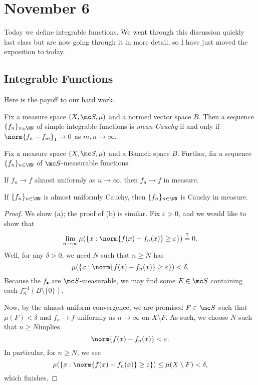 \documentclass[../notes.tex]{subfiles}
\begin{document}
\section{November 6}

Today we define integrable functions. We went through this discussion quickly last class but are now going through it in more detail, so I have just moved the exposition to today.

\subsection{Integrable Functions}
Here is the payoff to our hard work.
\begin{definition}
	Fix a measure space $(X,\mc S,\mu)$ and a normed vector space $B$. Then a sequence $\{f_n\}_{n\in\NN}$ of simple integrable functions is \textit{mean Cauchy} if and only if $\norm{f_n-f_m}_1\to0$ as $m,n\to\infty$.
\end{definition}
\begin{lemma}
	Fix a measure space $(X,\mc S,\mu)$ and a Banach space $B$. Further, fix a sequence $\{f_n\}_{n\in\NN}$ of $\mc S$-measurable functions.
	\begin{listalph}
		\item If $f_n\to f$ almost uniformly as $n\to\infty$, then $f_n\to f$ in measure.
		\item If $\{f_n\}_{n\in\NN}$ is almost uniformly Cauchy, then $\{f_n\}_{n\in\NN}$ is Cauchy in measure.
	\end{listalph}
\end{lemma}
\begin{proof}
	We show (a); the proof of (b) is similar. Fix $\varepsilon>0$, and we would like to show that
	\[\lim_{n\to\infty}\mu(\{x:\norm{f(x)-f_n(x)}\ge\varepsilon\})\stackrel?=0.\]
	Well, for any $\delta>0$, we need $N$ such that $n\ge N$ has
	\[\mu(\{x:\norm{f(x)-f_n(x)}\ge\varepsilon\})<\delta.\]
	Because the $f_\bullet$ are $\mc S$-measurable, we may find some $E\in\mc S$ containing each $f_n^{-1}(B\setminus\{0\})$.

	Now, by the almost uniform convergence, we are promised $F\in\mc S$ such that $\mu(F)<\delta$ and $f_n\to f$ uniformly as $n\to\infty$ on $X\setminus F$. As such, we choose $N$ such that $n\ge N$implies
	\[\norm{f(x)-f_n(x)}<\varepsilon.\]
	In particular, for $n\ge N$, we see
	\[\mu(\{x:\norm{f(x)-f_n(x)}\ge\varepsilon\})\le\mu(X\setminus F)<\delta,\]
	which finishes.
\end{proof}
\end{document}
